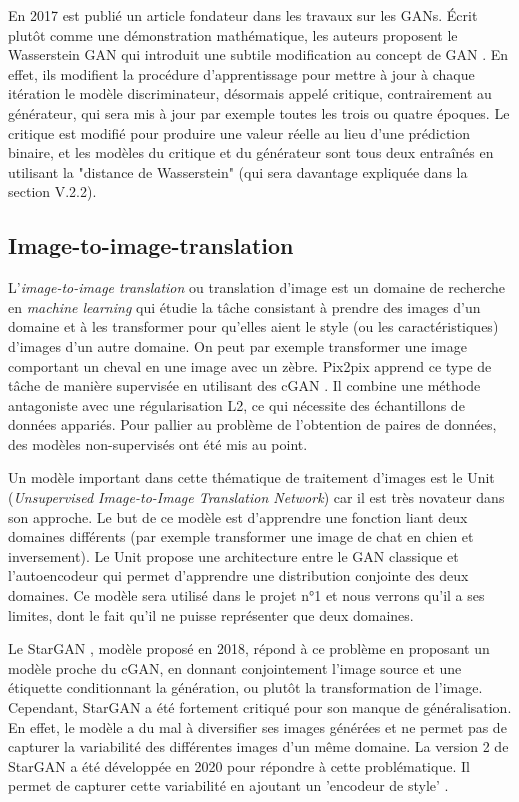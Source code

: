 \documentclass[12pt, oneside, a4paper, titlepage]{article}
\begin{document}
En 2017 est publié un article fondateur dans les travaux sur les GANs. Écrit plutôt comme une démonstration mathématique, les auteurs proposent le Wasserstein GAN qui introduit une subtile modification au concept de GAN \cite{arjovsky_wasserstein_2017}. En effet, ils modifient la procédure d'apprentissage pour mettre à jour  à chaque itération le modèle discriminateur, désormais appelé critique, contrairement au générateur, qui sera mis à jour par exemple toutes les trois ou quatre époques. Le critique est modifié pour produire une valeur réelle au lieu d'une prédiction binaire, et les modèles du critique et du générateur sont tous deux entraînés en utilisant la "distance de Wasserstein" (qui sera davantage expliquée dans la section V.2.2). 

 
\subsection{Image-to-image-translation}


L'\textit{image-to-image translation} ou translation d'image est un domaine de recherche en \textit{machine learning} qui étudie la tâche consistant à prendre des images d'un domaine et à les transformer pour qu'elles aient le style (ou les caractéristiques) d'images d'un autre domaine. On peut par exemple transformer une image comportant un cheval en une image avec un zèbre. Pix2pix apprend ce type de tâche de manière supervisée en utilisant des cGAN \cite{isola_image--image_2018}. Il combine une méthode antagoniste avec une régularisation L2, ce qui nécessite des échantillons de données appariés. Pour pallier au problème de l'obtention de paires de données, des modèles non-supervisés ont été mis au point. 

Un modèle important dans cette thématique de traitement d’images est le Unit (\textit{Unsupervised Image-to-Image Translation Network}) \cite{liu_unsupervised_2018} car il est très novateur dans son approche. Le but de ce modèle est d’apprendre une fonction liant deux domaines différents (par exemple transformer une image de chat en chien et inversement). Le Unit propose une architecture entre le GAN classique et l’autoencodeur qui permet d’apprendre une distribution conjointe des deux domaines. Ce modèle sera utilisé dans le projet n°1 et nous verrons qu’il a ses limites, dont le fait qu’il ne puisse représenter que deux domaines. 

Le StarGAN \cite{choi_stargan_2018}, modèle proposé en 2018, répond à ce problème en proposant un modèle proche du cGAN, en donnant conjointement l’image source et une étiquette conditionnant la génération, ou plutôt la transformation de l'image. Cependant, StarGAN a été fortement critiqué pour son manque de généralisation. En effet, le modèle a du mal à diversifier ses images générées et ne permet pas de capturer la variabilité des différentes images d'un même domaine. La version 2 de StarGAN \cite{choi_stargan_2020} a été développée en 2020 pour répondre à cette problématique. Il permet de capturer cette variabilité en ajoutant un 'encodeur de style' . 
\end{document}
